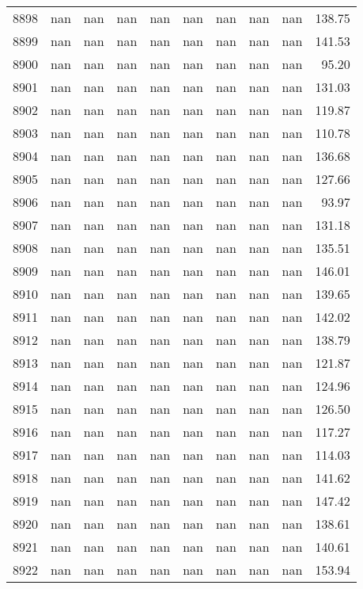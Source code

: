 \begin{tabular}{lrrrrrrrrr}
8898 & nan & nan & nan & nan & nan & nan & nan & nan & 138.75 \\
8899 & nan & nan & nan & nan & nan & nan & nan & nan & 141.53 \\
8900 & nan & nan & nan & nan & nan & nan & nan & nan & 95.20 \\
8901 & nan & nan & nan & nan & nan & nan & nan & nan & 131.03 \\
8902 & nan & nan & nan & nan & nan & nan & nan & nan & 119.87 \\
8903 & nan & nan & nan & nan & nan & nan & nan & nan & 110.78 \\
8904 & nan & nan & nan & nan & nan & nan & nan & nan & 136.68 \\
8905 & nan & nan & nan & nan & nan & nan & nan & nan & 127.66 \\
8906 & nan & nan & nan & nan & nan & nan & nan & nan & 93.97 \\
8907 & nan & nan & nan & nan & nan & nan & nan & nan & 131.18 \\
8908 & nan & nan & nan & nan & nan & nan & nan & nan & 135.51 \\
8909 & nan & nan & nan & nan & nan & nan & nan & nan & 146.01 \\
8910 & nan & nan & nan & nan & nan & nan & nan & nan & 139.65 \\
8911 & nan & nan & nan & nan & nan & nan & nan & nan & 142.02 \\
8912 & nan & nan & nan & nan & nan & nan & nan & nan & 138.79 \\
8913 & nan & nan & nan & nan & nan & nan & nan & nan & 121.87 \\
8914 & nan & nan & nan & nan & nan & nan & nan & nan & 124.96 \\
8915 & nan & nan & nan & nan & nan & nan & nan & nan & 126.50 \\
8916 & nan & nan & nan & nan & nan & nan & nan & nan & 117.27 \\
8917 & nan & nan & nan & nan & nan & nan & nan & nan & 114.03 \\
8918 & nan & nan & nan & nan & nan & nan & nan & nan & 141.62 \\
8919 & nan & nan & nan & nan & nan & nan & nan & nan & 147.42 \\
8920 & nan & nan & nan & nan & nan & nan & nan & nan & 138.61 \\
8921 & nan & nan & nan & nan & nan & nan & nan & nan & 140.61 \\
8922 & nan & nan & nan & nan & nan & nan & nan & nan & 153.94 \\

\end{tabular}
